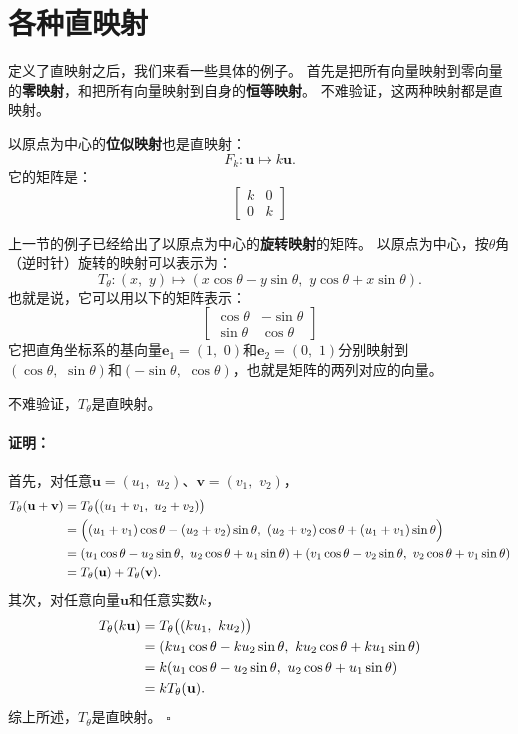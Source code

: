 \documentclass[12pt,UTF8]{ctexbook}
\renewenvironment{proof}{\paragraph{\textbf{证明：}}}{\hfill$\square$}
\begin{document}
\section{各种直映射}
定义了直映射之后，我们来看一些具体的例子。
首先是把所有向量映射到零向量的\textbf{零映射}，和把所有向量映射到自身的\textbf{恒等映射}。
不难验证，这两种映射都是直映射。

以原点为中心的\textbf{位似映射}也是直映射：
$$ F_k : \mathbf{u} \mapsto k\mathbf{u}.$$
它的矩阵是：
$$
\begin{bmatrix}
    k & 0 \\ 0 & k
\end{bmatrix}
$$

上一节的例子已经给出了以原点为中心的\textbf{旋转映射}的矩阵。
以原点为中心，按$\theta$角（逆时针）旋转的映射可以表示为：
$$T_{\theta}: (x,\,\, y) \mapsto (x\cos{\theta} - y\sin{\theta},\,\,y\cos{\theta} + x\sin{\theta}).$$
也就是说，它可以用以下的矩阵表示：
$$
\begin{bmatrix}
    \cos{\theta} & -\sin{\theta} \\ \sin{\theta} & \cos{\theta}
\end{bmatrix}
$$
它把直角坐标系的基向量$\mathbf{e}_1 = (1,\,\,0)$和$\mathbf{e}_2 = (0,\,\,1)$分别映射到
$(\cos{\theta},\,\,\sin{\theta})$和$(-\sin{\theta},\,\,\cos{\theta})$，也就是矩阵的两列对应的向量。

不难验证，$T_{\theta}$是直映射。 
\begin{proof}
    首先，对任意$\mathbf{u} = (u_1,\,\, u_2)$、$\mathbf{v} = (v_1,\,\,v_2)$，
    \begin{align}
        T_{\theta} (\mathbf{u} + \mathbf{v}) &= T_{\theta} \big((u_1 + v_1,\,\, u_2 + v_2)\big) \notag \\
        &= \Big((u_1 + v_1)\cos{\theta} - (u_2 + v_2)\sin{\theta},\,\,(u_2 + v_2)\cos{\theta} + (u_1 + v_1)\sin{\theta}\Big)\notag \\
        &= (u_1\cos{\theta} - u_2\sin{\theta},\,\,u_2\cos{\theta} + u_1\sin{\theta}) + (v_1\cos{\theta} - v_2\sin{\theta},\,\,v_2\cos{\theta} + v_1\sin{\theta})\notag \\
        &= T_{\theta} (\mathbf{u}) + T_{\theta}(\mathbf{v}). \notag
    \end{align}
    其次，对任意向量$\mathbf{u}$和任意实数$k$，
    \begin{align}
        T_{\theta} (k\mathbf{u}) &= T_{\theta} \big((ku_1,\,\, ku_2)\big) \notag \\
        &= (ku_1\cos{\theta} - ku_2\sin{\theta},\,\,ku_2\cos{\theta} + ku_1\sin{\theta})\notag \\
        &= k(u_1\cos{\theta} - u_2\sin{\theta},\,\,u_2\cos{\theta} + u_1\sin{\theta})\notag \\
        &= kT_{\theta} (\mathbf{u}). \notag
    \end{align}  
    综上所述，$T_{\theta}$是直映射。
\end{proof}
\end{document}
